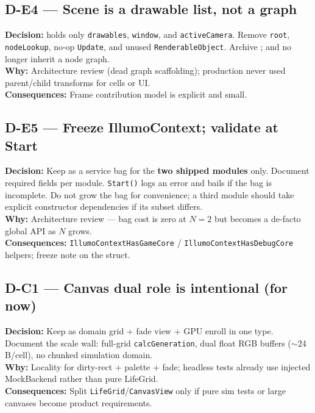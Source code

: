 \subsection*{D-E4 --- Scene is a drawable list, not a graph}
\begin{decisionbox}[title={D-E4 \quad 2026-07-28}]
\textbf{Decision:}  holds only \texttt{drawables},
\texttt{window}, and \texttt{activeCamera}. Remove \texttt{root},
\texttt{nodeLookup}, no-op \texttt{Update}, and unused
\texttt{RenderableObject}. Archive ; 
and  no longer inherit a node graph.\\
\textbf{Why:} Architecture review (dead graph scaffolding); production never
used parent/child transforms for cells or UI.\\
\textbf{Consequences:} Frame contribution model is explicit and small.
\end{decisionbox}

\subsection*{D-E5 --- Freeze IllumoContext; validate at Start}
\begin{decisionbox}[title={D-E5 \quad 2026-07-28}]
\textbf{Decision:} Keep  as a service bag for the
\textbf{two shipped modules} only. Document required fields per module.
\texttt{Start()} logs an error and bails if the bag is incomplete.
Do not grow the bag for convenience; a third module should take explicit
constructor dependencies if its subset differs.\\
\textbf{Why:} Architecture review --- bag cost is zero at $N=2$ but becomes a
de-facto global API as $N$ grows.\\
\textbf{Consequences:} \texttt{IllumoContextHasGameCore} /
\texttt{IllumoContextHasDebugCore} helpers; freeze note on the struct.
\end{decisionbox}

\subsection*{D-C1 --- Canvas dual role is intentional (for now)}
\begin{decisionbox}[title={D-C1 \quad 2026-07-28}]
\textbf{Decision:} Keep  as domain grid + fade view + GPU
enroll in one type. Document the scale wall: full-grid
\texttt{calcGeneration}, dual float RGB buffers ($\sim$24\,B/cell), no
chunked simulation domain.\\
\textbf{Why:} Locality for dirty-rect + palette + fade; headless tests already
use injected MockBackend rather than pure LifeGrid.\\
\textbf{Consequences:} Split \texttt{LifeGrid}/\texttt{CanvasView} only if pure
sim tests or large canvases become product requirements.
\end{decisionbox}


